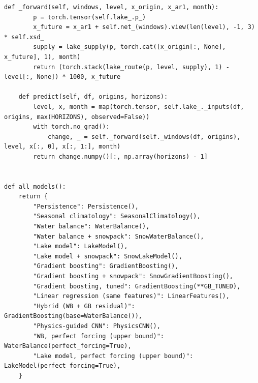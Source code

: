 \documentclass{article}
\begin{document}
\begin{lstlisting}[caption={Physics-guided CNN and the list of models}]
    def _forward(self, windows, level, x_origin, x_ar1, month):
        p = torch.tensor(self.lake_.p_)
        x_future = x_ar1 + self.net_(windows).view(len(level), -1, 3) * self.xsd_
        supply = lake_supply(p, torch.cat([x_origin[:, None], x_future], 1), month)
        return (torch.stack(lake_route(p, level, supply), 1) - level[:, None]) * 1000, x_future

    def predict(self, df, origins, horizons):
        level, x, month = map(torch.tensor, self.lake_._inputs(df, origins, max(HORIZONS), observed=False))
        with torch.no_grad():
            change, _ = self._forward(self._windows(df, origins), level, x[:, 0], x[:, 1:], month)
        return change.numpy()[:, np.array(horizons) - 1]


def all_models():
    return {
        "Persistence": Persistence(),
        "Seasonal climatology": SeasonalClimatology(),
        "Water balance": WaterBalance(),
        "Water balance + snowpack": SnowWaterBalance(),
        "Lake model": LakeModel(),
        "Lake model + snowpack": SnowLakeModel(),
        "Gradient boosting": GradientBoosting(),
        "Gradient boosting + snowpack": SnowGradientBoosting(),
        "Gradient boosting, tuned": GradientBoosting(**GB_TUNED),
        "Linear regression (same features)": LinearFeatures(),
        "Hybrid (WB + GB residual)": GradientBoosting(base=WaterBalance()),
        "Physics-guided CNN": PhysicsCNN(),
        "WB, perfect forcing (upper bound)": WaterBalance(perfect_forcing=True),
        "Lake model, perfect forcing (upper bound)": LakeModel(perfect_forcing=True),
    }
\end{lstlisting}
\end{document}
